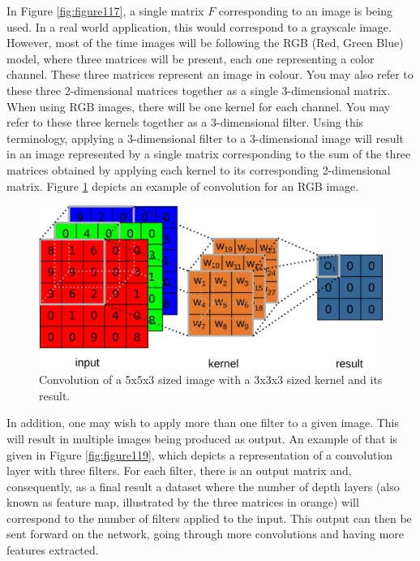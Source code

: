 In Figure \ref{fig:figure117}, a single matrix $F$ corresponding to an image is being used. In a real world application, this would correspond to a grayscale image. However, most of the time images will be following the RGB (Red, Green Blue) model, where three matrices will be present, each one representing a color channel. These three matrices represent an image in colour. You may also refer to these three 2-dimensional matrices together as a single 3-dimensional matrix. When using RGB images, there will be one kernel for each channel. You may refer to these three kernels together  as a 3-dimensional filter. Using this terminology, applying a 3-dimensional filter to a 3-dimensional image will result in an image represented by a single matrix corresponding to the sum of the three matrices obtained by applying each kernel to its corresponding 2-dimensional matrix. Figure \ref{fig:figure118} depicts an example of convolution for an RGB image. %

\begin{figure}[h]
    \centering
    \includegraphics[scale=0.35]{"Part 3 - Learning Systems/Supervised Learning/Deep Learning/images/figure118.png"}
    \caption{Convolution of a 5x5x3 sized image with a 3x3x3 sized kernel and its result.} 
    \label{fig:figure118}
\end{figure}

In addition, one may wish to apply more than one filter to a given image. This will result in multiple images being produced as output. An example of that is given in Figure \ref{fig:figure119}, which depicts a representation of a convolution layer with three filters. For each filter, there is an output matrix and, consequently, as a final result a dataset where the number of depth layers (also known as feature map, illustrated by the three matrices in orange) will correspond to the number of filters applied to the input. This output can then be sent forward on the network, going through more convolutions and having more features extracted.

